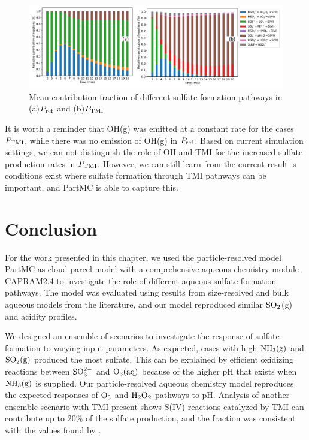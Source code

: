 \documentclass[edeposit,fullpage]{uiucthesis2009}
\begin{document}
\begin{figure}[ht]
    \centering
    \includegraphics[scale=0.57]{chap2_figs/chap2-TMI_contri_factors.pdf}
    \caption{Mean contribution fraction of different sulfate formation
      pathways in (a)$P_{\rm ref}$ and (b)$P_{\rm TMI}$}
    \label{chap2:iron-contri}
\end{figure}

It is worth a reminder that OH(g) was emitted at a constant rate for
the cases $P_{\rm TMI}$, while there was no emission of OH(g) in
$P_{\rm ref}$. Based on current simulation settings, we can not
distinguish the role of OH and TMI for the increased sulfate
production rates in $P_{\rm TMI}$.  However, we can still learn from
the current result is conditions exist where sulfate formation through
TMI pathways can be important, and PartMC is able to capture this.

\section{Conclusion}
\label{chap2.6}
For the work presented in this chapter, we used the particle-resolved
model PartMC as cloud parcel model with a comprehensive aqueous
chemistry module CAPRAM2.4 to investigate the role of different
aqueous sulfate formation pathways. The model was evaluated using
results from size-resolved and bulk aqueous models from the
literature, and our model reproduced similar $\rm SO_2$(g) and acidity
profiles.

We designed an ensemble of scenarios to investigate the response of
sulfate formation to varying input parameters. As expected, cases with
high $\rm NH_3(g)$ and $\rm SO_2(g)$ produced the most sulfate. This
can be explained by efficient oxidizing reactions between $\rm
SO_3^{2-}$ and $\rm O_3(aq)$ because of the higher pH that exists when
$\rm NH_3(g)$ is supplied. Our particle-resolved aqueous chemistry
model reproduces the expected responses of $\rm O_3$ and $\rm H_2O_2$
pathways to pH. Analysis of another ensemble scenario with TMI present
shows S(IV) reactions catalyzed by TMI can contribute up to 20\% of
the sulfate production, and the fraction was consistent with the
values found by \citet{alexander2009transition}.
\end{document}
